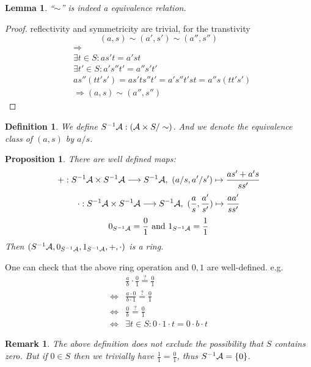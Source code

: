 \documentclass[11pt]{article}
\newtheorem{prop}[thm]{Proposition}
\newtheorem{lemma}[thm]{Lemma}
\newtheorem{dfn}[thm]{Definition}
\newtheorem{rmk}[thm]{Remark}
\newcommand{\cala}{{\cal A}}
\newcommand{\Lrta}{\Longrightarrow}
\newcommand{\lrta}{\longrightarrow}
\newcommand{\Llrta}{\Longleftrightarrow}
\begin{document}
\begin{lemma}
``$\sim$'' is indeed a equivalence relation.
\end{lemma}
\begin{proof}
reflectivity and symmetricity are trivial, for the transtivity
$$
(a,s)\sim(a',s')\sim (a'',s'')
$$
$$
\begin{aligned}
&\Lrta\\
&\exists t\in S: as't=a's t\\
& \exists t'\in S: a's'' t'=a''s't'\\
&as''(tt's')=as'ts''t'=a's''t's t=a''s (t t's')\\
& \Lrta (a,s)\sim(a'',s'')
\end{aligned}
$$
\end{proof}
\begin{dfn}
We define 
$S^{-1}\cala:(\cala\times S/\sim)$.  And we denote the equivalence class of $(a,s)$ by $a/s$.
\end{dfn}
\begin{prop}
There are well defined maps:
$$
+:S^{-1}\cala\times S^{-1}\cala\lrta S^{-1}\cala,\ (a/s,a'/s')\mapsto \frac{as'+a's}{ss'}
$$
$$
\cdot:S^{-1}\cala\times S^{-1}\cala\lrta S^{-1}\cala,\ (\frac{a}{s},\frac{a'}{s'})\mapsto \frac{aa'}{ss'}
$$
$$
0_{S^{-1}\cala}=\frac{0}{1}\text{ and } 1_{S^{-1}\cala}=\frac{1}{1}
$$
Then $(S^{-1}\cala,0_{S^{-1}\cala},1_{S^{-1}\cala},+,\cdot)$ is a ring.
\end{prop}
One can check that the above ring operation and $0,1$ are well-defined. e.g.\\
$$
\begin{aligned}
&\frac{a}{b}\cdot\frac{0}{1}\overset{?}{=}\frac{0}{1}\\
\Llrta & \frac{a\cdot 0}{b\cdot 1}\overset{?}{=}\frac{0}{1}\\
\Llrta & \frac{0}{b}\overset{?}{=}\frac{0}{1}\\
\Llrta &\exists t\in S: 0\cdot 1\cdot t=0\cdot b\cdot t
\end{aligned}
$$

\begin{rmk}
{\color{red}The above definition does not exclude the possibility that $S$ contains zero. But if $0\in S$ then we trivially have $\frac{1}{1}=\frac{0}{1}$, thus $S^{-1}\cala=\{0\}$}.
\end{rmk}
\end{document}
